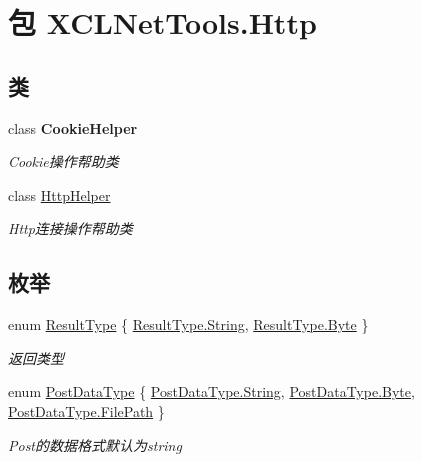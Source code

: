 \hypertarget{namespace_x_c_l_net_tools_1_1_http}{\section{包 X\-C\-L\-Net\-Tools.\-Http}
\label{namespace_x_c_l_net_tools_1_1_http}
}
\subsection*{类}
\begin{DoxyCompactItemize}
\item 
class {\bfseries Cookie\-Helper}
\begin{DoxyCompactList}\small\item\em Cookie操作帮助类 \end{DoxyCompactList}\item 
class \hyperlink{class_x_c_l_net_tools_1_1_http_1_1_http_helper}{Http\-Helper}
\begin{DoxyCompactList}\small\item\em Http连接操作帮助类 \end{DoxyCompactList}\end{DoxyCompactItemize}
\subsection*{枚举}
\begin{DoxyCompactItemize}
\item 
enum \hyperlink{namespace_x_c_l_net_tools_1_1_http_a3216524397972f7d0c5733b123216e9e}{Result\-Type} \{ \hyperlink{namespace_x_c_l_net_tools_1_1_http_a3216524397972f7d0c5733b123216e9ea27118326006d3829667a400ad23d5d98}{Result\-Type.\-String}, 
\hyperlink{namespace_x_c_l_net_tools_1_1_http_a3216524397972f7d0c5733b123216e9eaa245c3230debe5c956484ecc6fa93877}{Result\-Type.\-Byte}
 \}
\begin{DoxyCompactList}\small\item\em 返回类型 \end{DoxyCompactList}\item 
enum \hyperlink{namespace_x_c_l_net_tools_1_1_http_ad73fffd49af2087d4f5c0a954d15d08c}{Post\-Data\-Type} \{ \hyperlink{namespace_x_c_l_net_tools_1_1_http_ad73fffd49af2087d4f5c0a954d15d08ca27118326006d3829667a400ad23d5d98}{Post\-Data\-Type.\-String}, 
\hyperlink{namespace_x_c_l_net_tools_1_1_http_ad73fffd49af2087d4f5c0a954d15d08caa245c3230debe5c956484ecc6fa93877}{Post\-Data\-Type.\-Byte}, 
\hyperlink{namespace_x_c_l_net_tools_1_1_http_ad73fffd49af2087d4f5c0a954d15d08ca2fb403e71d8ade2ba79af3f6c4695d09}{Post\-Data\-Type.\-File\-Path}
 \}
\begin{DoxyCompactList}\small\item\em Post的数据格式默认为string \end{DoxyCompactList}\end{DoxyCompactItemize}


